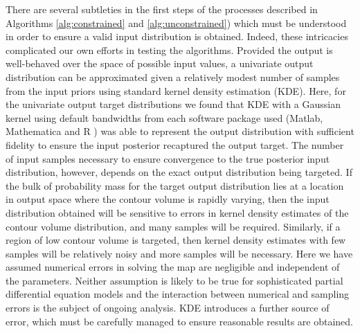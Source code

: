 \documentclass[10pt,letterpaper]{article}
\begin{document}
There are several subtleties in the first steps of the processes described in Algorithms \ref{alg:constrained} and \ref{alg:unconstrained}) which must be understood in order to ensure a valid input distribution is obtained. Indeed, these intricacies complicated our own efforts in testing the algorithms. Provided the output is well-behaved over the space of possible input values, a univariate output distribution can be approximated given a relatively modest number of samples from the input priors using standard kernel density estimation (KDE). Here, for the univariate output target distributions we found that KDE with a Gaussian kernel using default bandwidths from each software package used (Matlab, Mathematica and R \cite{MATLAB:2016,mathematica,RLanguage}) was able to represent the output distribution with sufficient fidelity to ensure the input posterior recaptured the output target. The number of input samples necessary to ensure convergence to the true posterior input distribution, however, depends on the exact output distribution being targeted. If the bulk of probability mass for the target output distribution lies at a location in output space where the contour volume is rapidly varying, then the input distribution obtained will be sensitive to errors in kernel density estimates of the contour volume distribution, and many samples will be required. Similarly, if a region of low contour volume is targeted, then kernel density estimates with few samples will be relatively noisy and more samples will be necessary. Here we have assumed numerical errors in solving the map are negligible and independent of the parameters. Neither assumption is likely to be true for sophisticated partial differential equation models and the interaction between numerical and sampling errors is the subject of ongoing analysis. KDE introduces a further source of error, which must be carefully managed to ensure reasonable results are obtained.
\end{document}
